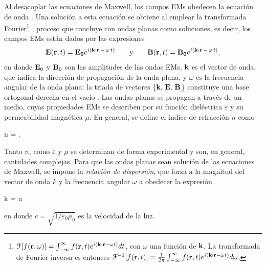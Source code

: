 Al desacoplar las ecuaciones de Maxwell, los campos EMs obedecen la ecuación de onda \cite{hecht1998optics}.  Una solución a esta ecuación se obtiene al emplear la transformada Fourier\footnote{  $\mathcal{F}[f(\vb{r},\omega)] = \int_{-\infty}^\infty f(\vb{r},t) e^{i(\vb{k}\cdot\vb{r} -\omega t)} dt$, con $\omega$ una función de $\vb{k}$. La transformada de Fourier inversa es entonces $\mathcal{F}^{-1}[f(\vb{r},t)] =\frac{1}{2\pi} \int_{-\infty}^\infty f(\vb{r},t) e^{i(\vb{k}\cdot\vb{r} -\omega t)} d\omega$.} \cite{jackson1999electrodynamics}, proceso que concluye con ondas planas como soluciones, es decir, los campos EMs están dados por las expresiones 
	\begin{align}
	\vb{E}(\vb{r},t) =\vb{E_0}e^{i(\vb{k}\cdot\vb{r} \,-\,\omega \,t)}
		\qquad\mbox{y}\qquad
	\vb{B}(\vb{r}, t) =\vb{B_0}e^{i(\vb{k}\cdot\vb{r} \,-\,\omega\, t)},
	\label{eq:OndaPlana}
	\end{align}		
en donde  $\vb{E}_0$ y $\vb{B}_0$ son las amplitudes de las ondas EMs, $\vb{k}$ es el vector de onda, que indica la dirección de propagación de la onda plana, y $\omega$ es la frecuencia angular de la onda plana; la triada de vectores \{$\vb{k},\, \vb{E},\, \vb{B}$\} constituye una base ortogonal derecha en el vacío \cite{griffiths2013electrodynamics}. Las ondas planas se propagan a través de un medio, cuyas propiedades EMs se describen por su función dieléctrica $\varepsilon$ y su permeabilidad magnética $\mu$. En general, se define el índice de refracción $n$ como 	      \vspace*{-.5em}
	\begin{tcolorbox}[title = Índice de refracción, ams align]
	n = .
		\label{eq:indice} 
	\end{tcolorbox}\vspace*{-.5em}\noindent
Tanto $n$, como $\varepsilon$ y $\mu$ se determinan de forma experimental y son, en general, cantidades complejas. Para que las ondas planas sean solución de las ecuaciones de Maxwell, se impone la \emph{relación de dispersión}, que forza a  la magnitud del vector de onda $k$ y la frecuencia angular $\omega$ a obedecer la expresión \vspace*{-.5em}
	\begin{tcolorbox}[title = Relación de dispersión de una onda plana, ams align]
	k = n
	\label{eq:dispersion}
	\end{tcolorbox}\vspace*{-1em}\noindent
en donde  $c=\sqrt{1/\varepsilon_0\mu_0}$ es la velocidad de la luz.


